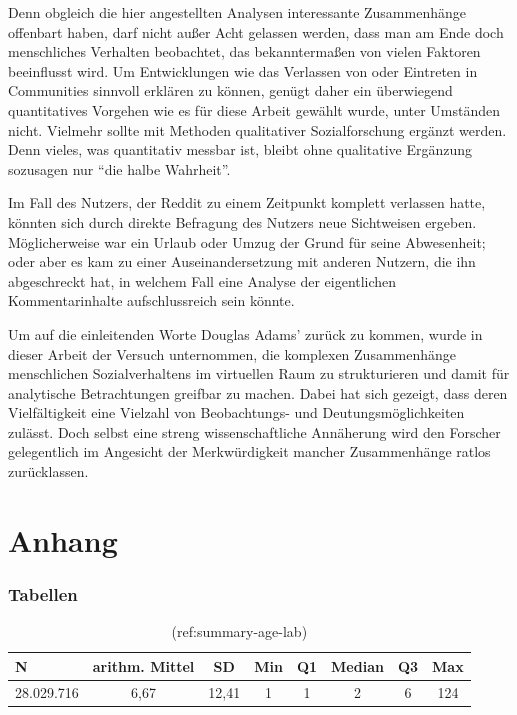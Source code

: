 \documentclass[11pt,a4paper,twoside]{article}
\begin{document}
Denn obgleich die hier angestellten Analysen interessante Zusammenhänge
offenbart haben, darf nicht außer Acht gelassen werden, dass man am Ende
doch menschliches Verhalten beobachtet, das bekanntermaßen von vielen
Faktoren beeinflusst wird. Um Entwicklungen wie das Verlassen von oder
Eintreten in Communities sinnvoll erklären zu können, genügt daher ein
überwiegend quantitatives Vorgehen wie es für diese Arbeit gewählt
wurde, unter Umständen nicht. Vielmehr sollte mit Methoden qualitativer
Sozialforschung ergänzt werden. Denn vieles, was quantitativ messbar
ist, bleibt ohne qualitative Ergänzung sozusagen nur \enquote{die halbe
Wahrheit}.

Im Fall des Nutzers, der Reddit zu einem Zeitpunkt komplett verlassen
hatte, könnten sich durch direkte Befragung des Nutzers neue Sichtweisen
ergeben. Möglicherweise war ein Urlaub oder Umzug der Grund für seine
Abwesenheit; oder aber es kam zu einer Auseinandersetzung mit anderen
Nutzern, die ihn abgeschreckt hat, in welchem Fall eine Analyse der
eigentlichen Kommentarinhalte aufschlussreich sein könnte.

Um auf die einleitenden Worte Douglas Adams' zurück zu kommen, wurde in
dieser Arbeit der Versuch unternommen, die komplexen Zusammenhänge
menschlichen Sozialverhaltens im virtuellen Raum zu strukturieren und
damit für analytische Betrachtungen greifbar zu machen. Dabei hat sich
gezeigt, dass deren Vielfältigkeit eine Vielzahl von Beobachtungs- und
Deutungsmöglichkeiten zulässt. Doch selbst eine streng wissenschaftliche
Annäherung wird den Forscher gelegentlich im Angesicht der
Merkwürdigkeit mancher Zusammenhänge ratlos zurücklassen.

\cleardoublepage

\hypertarget{part-anhang}{%
\part*{Anhang}\label{part-anhang}}


\hypertarget{appendix-anhang}{%
\appendix}


\hypertarget{tabellen}{%
\section{Tabellen}\label{tabellen}}

\begin{table}[!h]

\caption{\label{tab:activity-summary-full}(ref:summary-age-lab)}
\centering
\begin{tabular}[t]{lccccccc}
\toprule
N & arithm. Mittel & SD & Min & Q1 & Median & Q3 & Max\\
\midrule
28.029.716 & 6,67 & 12,41 & 1 & 1 & 2 & 6 & 124\\
\bottomrule
\end{tabular}
\end{table}
\end{document}
